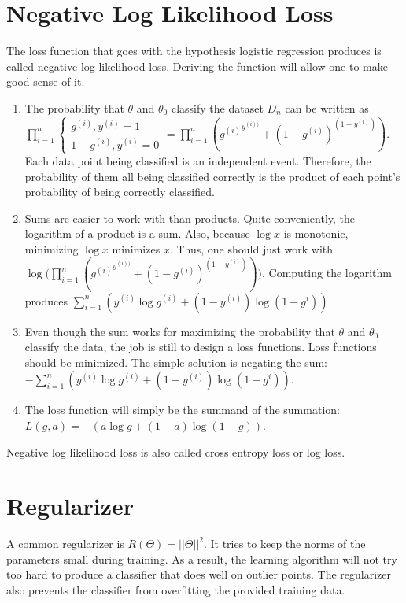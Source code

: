 \documentclass{article}
\begin{document}
    \section{Negative Log Likelihood Loss}
    The loss function that goes with the hypothesis logistic regression produces is called negative log likelihood loss. Deriving the function will allow one to make good sense of it.
        \begin{enumerate}
            \item The probability that $\theta$ and $\theta_0$ classify the dataset $D_n$ can be written as $\prod^n_{i=1}{\begin{cases}
                g^{(i)}, y^{(i)}=1\\
                1-g^{(i)} , y^{(i)}=0
            \end{cases}}=\prod^n_{i=1}({{g^{(i)}}^{y^{(i))}}+(1-g^{(i)})^{(1-y^{(i)})}})$.
            Each data point being classified is an independent event. Therefore, the probability of them all being classified correctly is the product of each point's probability of being correctly classified.

            \item Sums are easier to work with than products. Quite conveniently, the logarithm of a product is a sum. Also, because $\log{x}$ is monotonic, minimizing $\log{x}$ minimizes $x$. Thus, one should just work with $\log{(\prod^n_{i=1}({{g^{(i)}}^{y^{(i))}}+(1-g^{(i)})^{(1-y^{(i)})}})})$. Computing the logarithm produces $\sum^n_{i=1}({y^{(i)}\log{g^{(i)}}+(1-y^{(i)})\log{(1-g^{i})}})$.

            \item Even though the sum works for maximizing the probability that $\theta$ and $\theta_0$ classify the data, the job is still to design a loss functions. Loss functions should be minimized. The simple solution is negating the sum: $-\sum^n_{i=1}({y^{(i)}\log{g^{(i)}}+(1-y^{(i)})\log{(1-g^{i})}})$.

            \item The loss function will simply be the summand of the summation: $L(g,a)=-(a\log{g}+(1-a)\log{(1-g)})$.

        \end{enumerate}
    Negative log likelihood loss is also called cross entropy loss or log loss. \\

    \section{Regularizer}
    A common regularizer is $R(\Theta)=||\Theta||^2$. It tries to keep the norms of the parameters small during training. As a result, the learning algorithm will not try too hard to produce a classifier that does well on outlier points. The regularizer also prevents the classifier from overfitting the provided training data.
\end{document}
